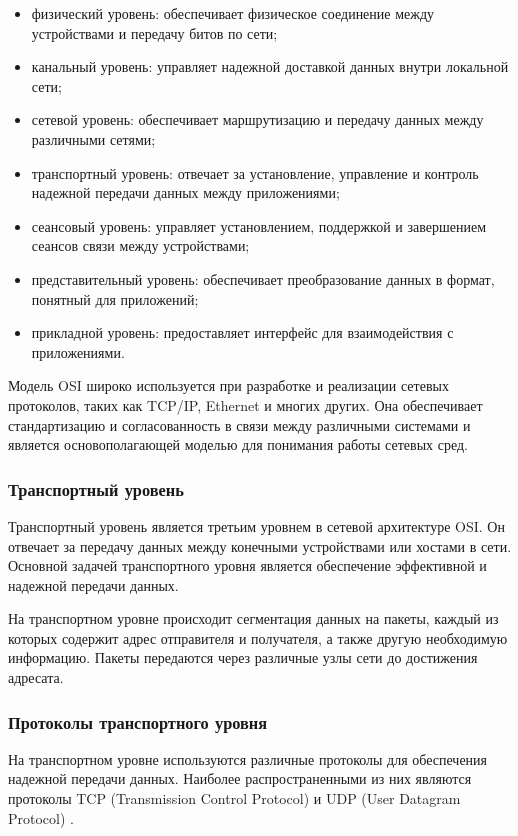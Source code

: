 \begin{itemize}
	\item физический уровень: обеспечивает физическое соединение между устройствами и передачу битов по сети;
	\item канальный уровень: управляет надежной доставкой данных внутри локальной сети;
	\item сетевой уровень: обеспечивает маршрутизацию и передачу данных между различными сетями;
	\item транспортный уровень: отвечает за установление, управление и контроль надежной передачи данных между приложениями;
	\item сеансовый уровень: управляет установлением, поддержкой и завершением сеансов связи между устройствами;
	\item представительный уровень: обеспечивает преобразование данных в формат, понятный для приложений;
	\item прикладной уровень: предоставляет интерфейс для взаимодействия с приложениями.
\end{itemize}

Модель OSI широко используется при разработке и реализации сетевых протоколов, таких как TCP/IP, Ethernet и многих других. Она обеспечивает стандартизацию и согласованность в связи между различными системами и является основополагающей моделью для понимания работы сетевых сред.

\subsubsection{Транспортный уровень}

Транспортный уровень является третьим уровнем в сетевой архитектуре OSI. Он отвечает за передачу данных между конечными устройствами или хостами в сети. Основной задачей транспортного уровня является обеспечение эффективной и надежной передачи данных.

На транспортном уровне происходит сегментация данных на пакеты, каждый из которых содержит адрес отправителя и получателя, а также другую необходимую информацию. Пакеты передаются через различные узлы сети до достижения адресата.

\subsubsection{Протоколы транспортного уровня}

На транспортном уровне используются различные протоколы для обеспечения надежной передачи данных. Наиболее распространенными из них являются протоколы TCP (Transmission Control Protocol) \cite{TCP} и UDP (User Datagram Protocol) \cite{UDP}.

